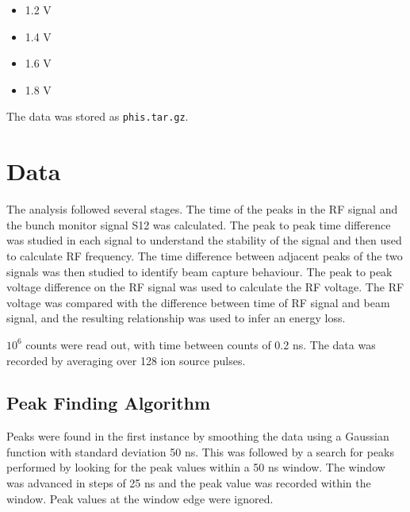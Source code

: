 \documentclass{paper}
\begin{document}
\begin{itemize}
\item 1.2 V
\item 1.4 V
\item 1.6 V
\item 1.8 V
\end{itemize}

The data was stored as \verb|phis.tar.gz|.

\section{Data}
The analysis followed several stages. The time of the peaks in the RF signal and 
the bunch monitor signal S12 was calculated. The peak to peak time difference
was studied in each signal to understand the stability of the signal and then 
used to calculate RF frequency. The time difference between adjacent peaks of 
the two signals was then studied to identify beam capture behaviour. The peak to
peak voltage difference on the RF signal was used to calculate the RF voltage. 
The RF voltage was compared with the difference between time of RF signal and
beam signal, and the resulting relationship was used to infer an energy loss.

$10^6$ counts were read out, with time between counts of 0.2 ns. The data 
was recorded by averaging over 128 ion source pulses.

\subsection{Peak Finding Algorithm}
Peaks were found in the first instance by smoothing the data using a Gaussian
function with standard deviation 50 ns. This was followed by a search for peaks 
performed by looking for the peak values within a 50 ns window. The window was
advanced in steps of 25 ns and the peak value was recorded within the window. 
Peak values at the window edge were ignored.
\end{document}

